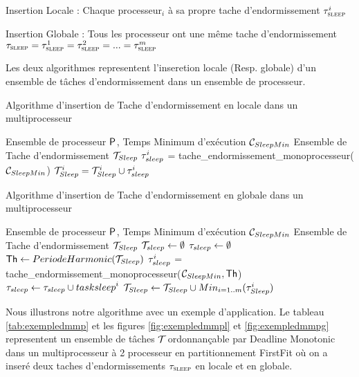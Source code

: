 \begin{description}
\item{Insertion Locale :} Chaque processeur$_i$ à sa propre tache
  d'endormissement $\tau_{\textsc{sleep}}^i$
\item{Insertion Globale :} Tous les processeur ont une même tache
  d'endormissement
  $\tau_{\textsc{sleep}}=\tau_{\textsc{sleep}}^1=\tau_{\textsc{sleep}}^2=...=\tau_{\textsc{sleep}}^m$
\end{description}
Les deux algorithmes representent l'inseretion locale (Resp. globale)
d'un ensemble de tâches d'endormissement dans un ensemble de
processeur.


\begin{algorithm}
\caption{Algorithme d'insertion de Tache d'endormissement en locale dans un multiprocesseur}
\label{dmmpl}
\begin{algorithmic}
\State Ensemble de processeur $\mathsf{P}_{}$, Temps Minimum d'exécution $\mathcal{C}_{SleepMin}$
\State Ensemble de Tache d'endormissement $\mathcal{T}_{Sleep}$
\State $\tau_{sleep}^i$ = tache\_endormissement\_monoprocesseur($\mathcal{C}_{SleepMin}$) 
\State $\mathcal{T}_{Sleep}^i =\mathcal{T}_{Sleep}^i \cup \tau_{sleep}^i$
\EndFor
\end{algorithmic}
\end{algorithm}

\begin{algorithm}
\caption{Algorithme d'insertion de Tache d'endormissement en globale dans un multiprocesseur}
\label{dmmpg}
\begin{algorithmic}
\State Ensemble de processeur $\mathsf{P}_{}$, Temps Minimum d'exécution $\mathcal{C}_{SleepMin}$
\State Ensemble de Tache d'endormissement $\mathcal{T}_{Sleep}$
\State $\mathcal{T}_{sleep} \leftarrow \emptyset$
\State $\tau_{sleep} \leftarrow \emptyset$
\State $\mathsf{Th} \leftarrow PeriodeHarmonic(\mathcal{T}_{Sleep})$
\State $\tau_{sleep}^i$ = tache\_endormissement\_monoprocesseur($\mathcal{C}_{SleepMin},\mathsf{Th}$) 
\State $\tau_{sleep} \leftarrow \tau_{sleep} \cup task{sleep}^i$
\EndFor
{}
\State $\mathcal{T}_{Sleep} \leftarrow \mathcal{T}_{Sleep} \cup Min_{i =1..m}(\tau_{Sleep}^i)$
\EndFor
\end{algorithmic}
\end{algorithm}


Nous illustrons notre algorithme avec un exemple d'application. Le
tableau \ref{tab:exempledmmp} et les figures \ref{fig:exempledmmpl} et
\ref{fig:exempledmmpg} representent un ensemble de tâches $\mathcal{T}_{}$
ordonnançable par Deadline Monotonic dans un multiprocesseur à 2
processeur en partitionnement FirstFit où on a inseré deux taches
d'endormissements $\tau_{\textsc{sleep}}$ en locale et en globale.

